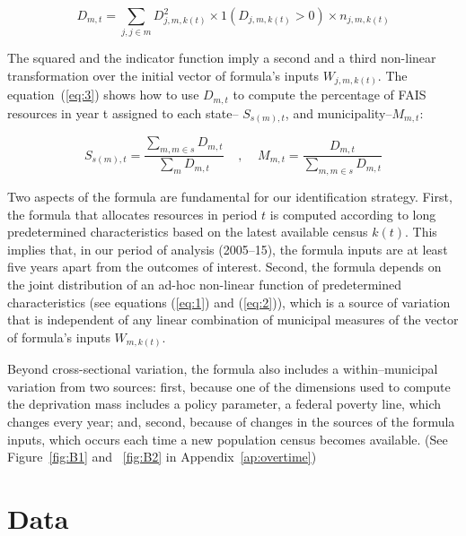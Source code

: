 \documentclass[dv_diss_main.tex]{subfiles}
\begin{document}
\begin{equation}\label{eq:2}
D_{m,t}=\sum_{j,j\in m} D_{j,m,k(t)}^2 \times 1(D_{j,m,k(t)}>0) \times n_{j,m,k(t)}  
\end{equation}

The squared and the indicator function imply a second and a third non-linear transformation over the initial vector of formula’s inputs $W_{j,m,k(t)}$. The equation~(\ref{eq:3}) shows how to use $D_{m,t}$ to compute the percentage of FAIS resources in year t assigned to each state-- $S_{s(m),t}$, and municipality--$M_{m,t}$:

\begin{equation}\label{eq:3}
S_{s(m),t}=\frac{\sum_{m,m \in s}D_{m,t}}{\sum_m D_{m,t}}\;\;\;\;,\;\;\;\; M_{m,t}=\frac{D_{m,t}}{\sum_{m,m \in s}D_{m,t}}   
\end{equation}

Two aspects of the formula are fundamental for our identification strategy. First, the formula that allocates resources in period $t$ is computed according to long predetermined characteristics based on the latest available census $k(t)$. This implies that, in our period of analysis (2005–15), the formula inputs are at least five years apart from the outcomes of interest. Second, the formula depends on the joint distribution of an ad-hoc non-linear function of predetermined characteristics (see equations (\ref{eq:1}) and (\ref{eq:2})), which is a source of variation that is independent of any linear combination of municipal measures of the vector of formula’s inputs $W_{m,k(t)}$.

Beyond cross-sectional variation, the formula also includes a within–municipal variation from two sources: first, because one of the dimensions used to compute the deprivation mass includes a policy parameter, a federal poverty line, which changes every year; and, second, because of changes in the sources of the formula inputs, which occurs each time a new population census becomes available. (See Figure~\ref{fig:B1} and ~\ref{fig:B2} in Appendix~\ref{ap:overtime})

\section{Data} \label{sec:data}
\end{document}
